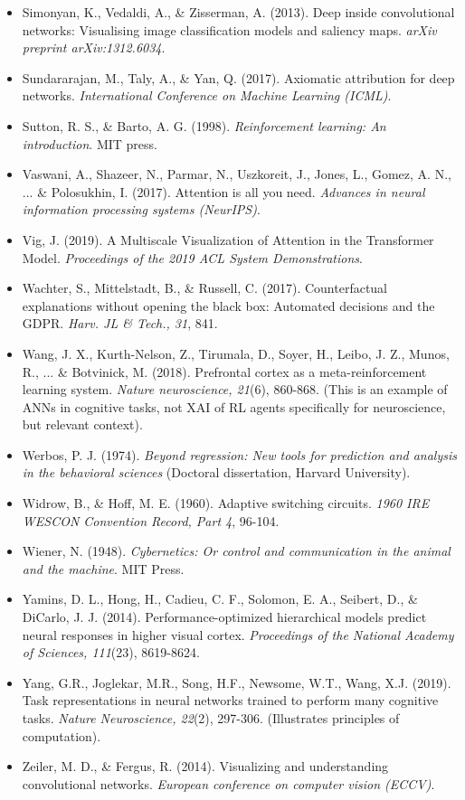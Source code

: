 \documentclass[11pt,a4paper]{article}
\begin{document}
\begin{itemize}
    \item Simonyan, K., Vedaldi, A., \& Zisserman, A. (2013). Deep inside convolutional networks: Visualising image classification models and saliency maps. \textit{arXiv preprint arXiv:1312.6034}.
    \item Sundararajan, M., Taly, A., \& Yan, Q. (2017). Axiomatic attribution for deep networks. \textit{International Conference on Machine Learning (ICML)}.
    \item Sutton, R. S., \& Barto, A. G. (1998). \textit{Reinforcement learning: An introduction}. MIT press.
    \item Vaswani, A., Shazeer, N., Parmar, N., Uszkoreit, J., Jones, L., Gomez, A. N., ... \& Polosukhin, I. (2017). Attention is all you need. \textit{Advances in neural information processing systems (NeurIPS)}.
    \item Vig, J. (2019). A Multiscale Visualization of Attention in the Transformer Model. \textit{Proceedings of the 2019 ACL System Demonstrations}.
    \item Wachter, S., Mittelstadt, B., \& Russell, C. (2017). Counterfactual explanations without opening the black box: Automated decisions and the GDPR. \textit{Harv. JL \& Tech., 31}, 841.
    \item Wang, J. X., Kurth-Nelson, Z., Tirumala, D., Soyer, H., Leibo, J. Z., Munos, R., ... \& Botvinick, M. (2018). Prefrontal cortex as a meta-reinforcement learning system. \textit{Nature neuroscience, 21}(6), 860-868. (This is an example of ANNs in cognitive tasks, not XAI of RL agents specifically for neuroscience, but relevant context).
    \item Werbos, P. J. (1974). \textit{Beyond regression: New tools for prediction and analysis in the behavioral sciences} (Doctoral dissertation, Harvard University).
    \item Widrow, B., \& Hoff, M. E. (1960). Adaptive switching circuits. \textit{1960 IRE WESCON Convention Record, Part 4}, 96-104.
    \item Wiener, N. (1948). \textit{Cybernetics: Or control and communication in the animal and the machine}. MIT Press.
    \item Yamins, D. L., Hong, H., Cadieu, C. F., Solomon, E. A., Seibert, D., \& DiCarlo, J. J. (2014). Performance-optimized hierarchical models predict neural responses in higher visual cortex. \textit{Proceedings of the National Academy of Sciences, 111}(23), 8619-8624.
    \item Yang, G.R., Joglekar, M.R., Song, H.F., Newsome, W.T., Wang, X.J. (2019). Task representations in neural networks trained to perform many cognitive tasks. \textit{Nature Neuroscience, 22}(2), 297-306. (Illustrates principles of computation).
    \item Zeiler, M. D., \& Fergus, R. (2014). Visualizing and understanding convolutional networks. \textit{European conference on computer vision (ECCV)}.
\end{itemize}
\end{document}
